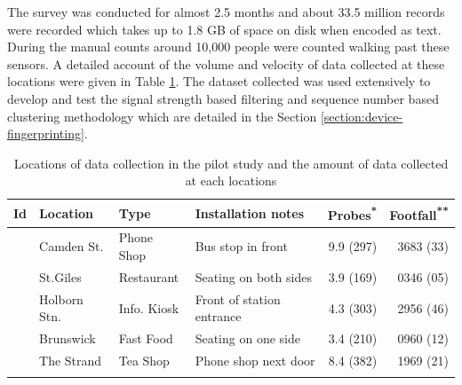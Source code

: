 The survey was conducted for almost 2.5 months and about 33.5 million records were recorded which takes up to 1.8 GB of space on disk when encoded as text.
During the manual counts around 10,000 people were counted walking past these sensors.
A detailed account of the volume and velocity of data collected at these locations were given in Table \ref{table:collection:pilot:locations}.
The dataset collected was used extensively to develop and test the signal strength based filtering and sequence number based clustering methodology which are detailed in the Section \ref{section:device-fingerprinting}.

\begin{table} \footnotesize
\begin{center} \begin{tabular}{clllrr} \toprule
Id & Location & Type & Installation notes & Probes\textsuperscript{*} & Footfall\textsuperscript{**}\\
\midrule \addlinespace[0.2cm]
1 & Camden St.    & Phone Shop  & Bus stop in front         & 9.9 (297) & 3683 (33)\\ \addlinespace[0.1cm]
2 & St.Giles      & Restaurant  & Seating on both sides     & 3.9 (169) & 0346 (05)\\ \addlinespace[0.1cm]
3 & Holborn Stn.  & Info. Kiosk & Front of station entrance & 4.3 (303) & 2956 (46)\\ \addlinespace[0.1cm]
4 & Brunswick     & Fast Food   & Seating  on one side      & 3.4 (210) & 0960 (12)\\ \addlinespace[0.1cm]
5 & The Strand    & Tea Shop    & Phone shop next door      & 8.4 (382) & 1969 (21)\\ \addlinespace[0.05cm]
\bottomrule \end{tabular} \end{center}
\caption{Locations of data collection in the pilot study and the amount of data collected at each locations}
\label{table:collection:pilot:locations}
\end{table}
